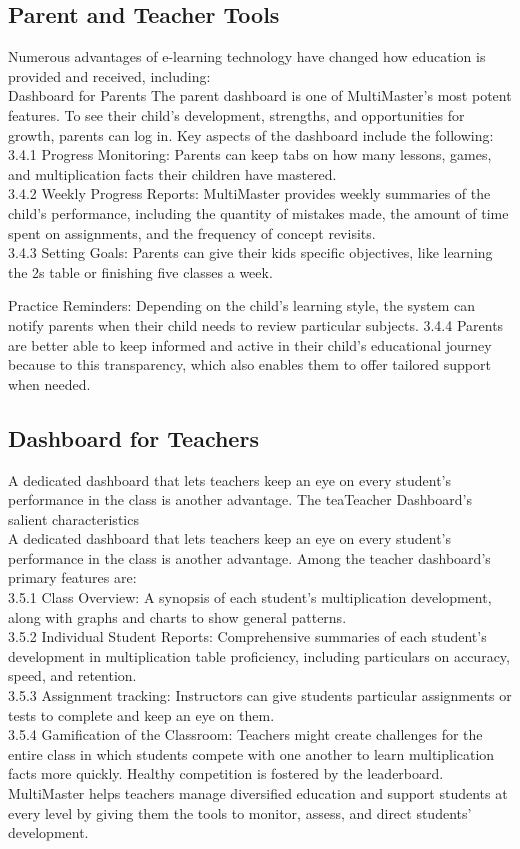 \documentclass[BTech]{audiss}
\begin{document}
\subsection{Parent and Teacher Tools}
Numerous advantages of e-learning technology have changed how education is provided and received, including:\\
Dashboard for Parents The parent dashboard is one of MultiMaster's most potent features. To see their child's development, strengths, and opportunities for growth, parents can log in. Key aspects of the dashboard include the following:\\
3.4.1 Progress Monitoring: Parents can keep tabs on how many lessons, games, and multiplication facts their children have mastered.\\
3.4.2 Weekly Progress Reports: MultiMaster provides weekly summaries of the child's performance, including the quantity of mistakes made, the amount of time spent on assignments, and the frequency of concept revisits.\\
3.4.3 Setting Goals: Parents can give their kids specific objectives, like learning the 2s table or finishing five classes a week.

Practice Reminders: Depending on the child's learning style, the system can notify parents when their child needs to review particular subjects. 3.4.4 Parents are better able to keep informed and active in their child's educational journey because to this transparency, which also enables them to offer tailored support when needed.

\subsection{Dashboard for Teachers}
A dedicated dashboard that lets teachers keep an eye on every student's performance in the class is another advantage. The teaTeacher Dashboard's salient characteristics\\

A dedicated dashboard that lets teachers keep an eye on every student's performance in the class is another advantage. Among the teacher dashboard's primary features are:\\
3.5.1 Class Overview: A synopsis of each student's multiplication development, along with graphs and charts to show general patterns. \\
3.5.2 Individual Student Reports: Comprehensive summaries of each student's development in multiplication table proficiency, including particulars on accuracy, speed, and retention.\\
3.5.3 Assignment tracking: Instructors can give students particular assignments or tests to complete and keep an eye on them.\\
3.5.4 Gamification of the Classroom: Teachers might create challenges for the entire class in which students compete with one another to learn multiplication facts more quickly. Healthy competition is fostered by the leaderboard. MultiMaster helps teachers manage diversified education and support students at every level by giving them the tools to monitor, assess, and direct students' development.
\end{document}
